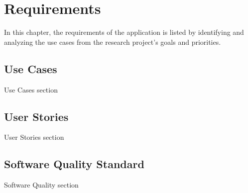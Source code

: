 \section{Requirements}
In this chapter, the requirements of the application is listed by identifying and analyzing the use cases from the research project's goals and priorities.

\subsection{Use Cases}
Use Cases section

\subsection{User Stories}
User Stories section

\subsection{Software Quality Standard}
Software Quality section